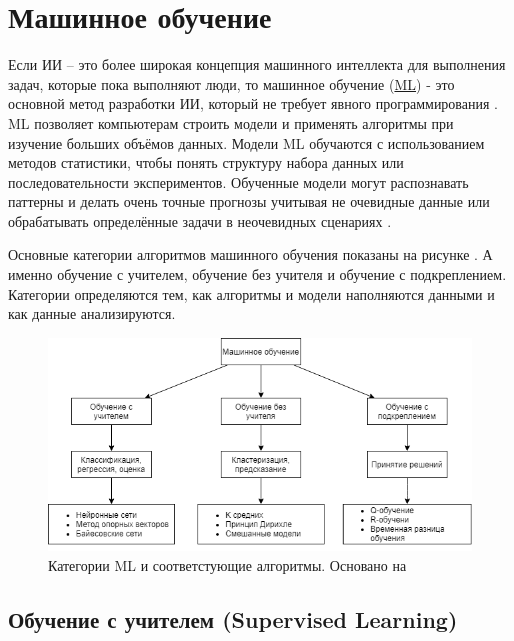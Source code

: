 \section{Машинное обучение} \label{ch1:ml}

Если ИИ – это более широкая концепция машинного интеллекта для выполнения задач, которые пока выполняют люди, то машинное обучение (\hyperref[acr:ml]{ML}) - это основной метод разработки ИИ, который не требует явного программирования \cite{Samuel-SomeStudies}. ML позволяет компьютерам строить модели и применять алгоритмы при изучение больших объёмов данных. Модели ML обучаются с использованием методов статистики, чтобы понять структуру набора данных или последовательности экспериментов. Обученные модели могут распознавать паттерны и делать очень точные прогнозы учитывая не очевидные данные или обрабатывать определённые задачи в неочевидных сценариях \cite{bishop06pattern}.

Основные категории алгоритмов машинного обучения показаны на рисунке . А именно обучение с учителем, обучение без учителя и обучение с подкреплением.
Категории определяются тем, как алгоритмы и модели наполняются данными и как данные анализируются.

\begin{figure}[ht!] 
	\center
	\includegraphics [scale=0.60] {my_folder/images/ch1/ML-categories.png}
	\caption{Категории ML и соответстующие алгоритмы. Основано на \cite{Sultan_2018}} 
	\label{fig:ch1-ML-categories}
\end{figure}

\subsection{Обучение с учителем (Supervised Learning)}

